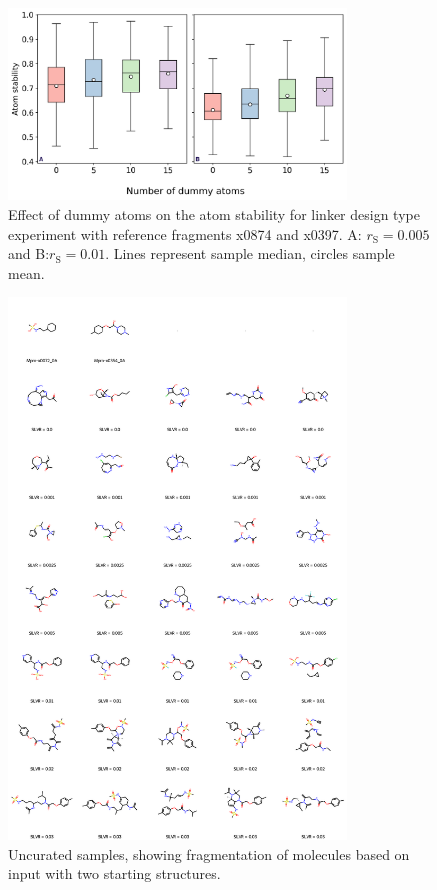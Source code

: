 \documentclass[journal=jacsat,manuscript=article]{achemso}
\begin{document}
\begin{suppinfo}
\begin{figure}
    \centering\includegraphics[width=0.8\textwidth]{paper/Figures/FigS7/dummy_atoms_different_rates.png}
    \caption{Effect of dummy atoms on the atom stability for linker design type experiment with reference fragments x0874 and x0397. A: $r_{\mathrm{S}} = 0.005$ and B:$r_{\mathrm{S}} = 0.01$. Lines represent sample median, circles sample mean.}
    \label{fig:dummy_atoms}
\end{figure}


\newpage


\begin{figure}
    \centering
    \includegraphics[width=0.8\textwidth]{paper/Figures/FigS6/mols_grid_silvr_rate_not_curated.png}
    \caption{Uncurated samples, showing fragmentation of molecules based on input with two starting structures.}
    \label{fig:uncurated_sample}
\end{figure}

\end{suppinfo}
\end{document}

